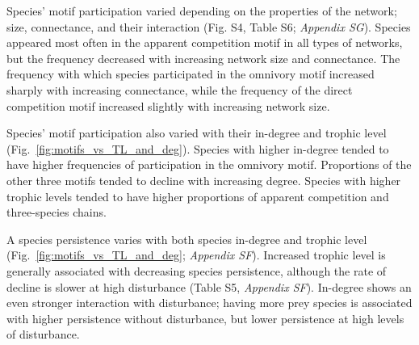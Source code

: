 \documentclass[12pt]{article}
\begin{document}
\begin{spacing}{2.0}
       Species' motif participation varied depending on the properties of the network; size, connectance, and their interaction (Fig. S4, Table S6; \emph{Appendix SG}).
       Species appeared most often in the apparent competition motif in all types of networks, but the frequency decreased with increasing network size and connectance.
       The frequency with which species participated in the omnivory motif increased sharply with increasing connectance, while the frequency of the direct competition motif increased slightly with increasing network size. 
        
       Species' motif participation also varied with their in-degree and trophic level (Fig.~\ref{fig:motifs_vs_TL_and_deg}).
       Species with higher in-degree tended to have higher frequencies of participation in the omnivory motif. Proportions of the other three motifs tended to decline with increasing degree.
       Species with higher trophic levels tended to have higher proportions of apparent competition and three-species chains. 
        
       A species persistence varies with both species in-degree and trophic level (Fig.~\ref{fig:motifs_vs_TL_and_deg}; \emph{Appendix SF}). Increased trophic level is generally associated with decreasing species persistence, although the rate of decline is slower at high disturbance (Table S5, \emph{Appendix SF}).
       In-degree shows an even stronger interaction with disturbance; having more prey species is associated with higher persistence without disturbance, but lower persistence at high levels of disturbance.
        


\end{spacing}
\end{document}
